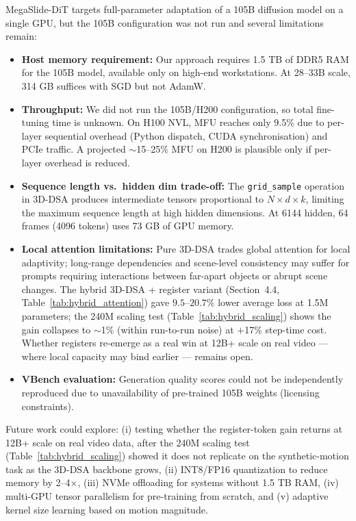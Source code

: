 \documentclass[11pt, letterpaper]{article}
\begin{document}
MegaSlide-DiT targets full-parameter adaptation of a 105B diffusion model on a single GPU, but the 105B configuration was not run and several limitations remain:

\begin{itemize}
    \item \textbf{Host memory requirement:} Our approach requires 1.5 TB of DDR5 RAM for the 105B model, available only on high-end workstations. At 28--33B scale, 314 GB suffices with SGD but not AdamW.
    \item \textbf{Throughput:} We did not run the 105B/H200 configuration, so total fine-tuning time is unknown. On H100 NVL, MFU reaches only 9.5\% due to per-layer sequential overhead (Python dispatch, CUDA synchronisation) and PCIe traffic. A projected $\sim$15--25\% MFU on H200 is plausible only if per-layer overhead is reduced.
    \item \textbf{Sequence length vs.\ hidden dim trade-off:} The \texttt{grid\_sample} operation in 3D-DSA produces intermediate tensors proportional to $N \times d \times k$, limiting the maximum sequence length at high hidden dimensions. At 6144 hidden, 64 frames (4096 tokens) uses 73 GB of GPU memory.
    \item \textbf{Local attention limitations:} Pure 3D-DSA trades global attention for local adaptivity; long-range dependencies and scene-level consistency may suffer for prompts requiring interactions between far-apart objects or abrupt scene changes. The hybrid 3D-DSA + register variant (Section~4.4, Table~\ref{tab:hybrid_attention}) gave $9.5$--$20.7\%$ lower average loss at 1.5M parameters; the 240M scaling test (Table~\ref{tab:hybrid_scaling}) shows the gain collapses to $\sim$1\% (within run-to-run noise) at $+$17\% step-time cost. Whether registers re-emerge as a real win at 12B+ scale on real video --- where local capacity may bind earlier --- remains open.
    \item \textbf{VBench evaluation:} Generation quality scores could not be independently reproduced due to unavailability of pre-trained 105B weights (licensing constraints).
\end{itemize}

Future work could explore: (i) testing whether the register-token gain returns at 12B+ scale on real video data, after the 240M scaling test (Table~\ref{tab:hybrid_scaling}) showed it does not replicate on the synthetic-motion task as the 3D-DSA backbone grows, (ii) INT8/FP16 quantization to reduce memory by 2--4$\times$, (iii) NVMe offloading for systems without 1.5 TB RAM, (iv) multi-GPU tensor parallelism for pre-training from scratch, and (v) adaptive kernel size learning based on motion magnitude.
\end{document}
